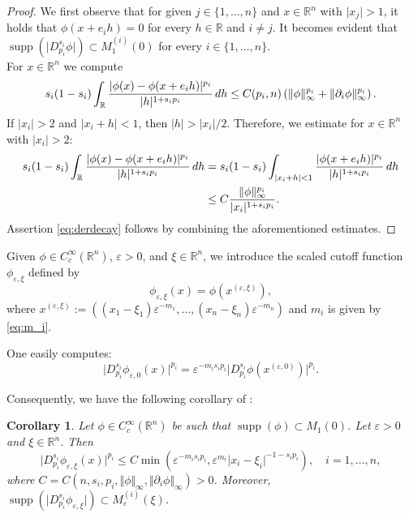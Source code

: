 \documentclass[11pt]{amsart}
\theoremstyle{plain}
\newtheorem{corollary}[theorem]{Corollary}
\theoremstyle{definition}
\numberwithin{equation}{section}
\renewcommand{\d}{\textnormal{d}}
\newcommand{\R}{\mathbb{R}}
\DeclareMathOperator{\supp}{supp}
\newcommand{\eps}{\varepsilon}
\begin{document}
\begin{proof}
We first observe that for given $j \in \{1,\dots,n\}$ and $x \in \R^n$ with $\vert x_j \vert > 1$, it holds that $\phi(x+e_ih) = 0$ for every $h \in \R$ and $i \neq j$. It becomes evident that $\supp(\vert D^{s_i}_{p_i}\phi\vert) \subset M_1^{(i)}(0)$ for every $i \in \{1,\dots,n\}$.\\
For $x \in \R^n$ we compute
\begin{equation*}
s_i(1-s_i)\int_{\mathbb{R}} \frac{|\phi(x)-\phi(x+e_ih)|^{p_i}}{|h|^{1+s_i p_i}} \,\d h \le C(p_i,n) \left(\Vert \phi \Vert_{\infty}^{p_i} + \Vert \partial_i \phi\Vert_{\infty}^{p_i}\right).
\end{equation*}
If $\vert x_i \vert > 2$ and $\vert x_i + h\vert < 1$, then $\vert h \vert > \vert x_i\vert /2$. Therefore, we estimate for $x \in \R^n$ with $\vert x_i \vert > 2$:
\begin{equation*}
\begin{split}
s_i(1-s_i)\int_{\mathbb{R}} \frac{|\phi(x)-\phi(x+e_ih)|^{p_i}}{|h|^{1+s_i p_i}} \,\d h 
&= s_i(1-s_i)\int_{\vert x_i + h \vert < 1} \frac{\vert\phi(x + e_ih)\vert^{p_i}}{\vert h \vert^{1+s_ip_i}} \, \d h \\
&\le C \frac{\Vert \phi\Vert_{\infty}^{p_i}}{\vert x_i \vert^{1+s_ip_i}}.
\end{split}
\end{equation*}
Assertion \eqref{eq:derdecay} follows by combining the aforementioned estimates.
\end{proof}

Given $\phi \in C_c^{\infty}(\R^n)$, $\eps > 0$, and $\xi \in \R^n$, we introduce the scaled cutoff function $\phi_{\eps,\xi}$ defined by 
\begin{equation}\label{def:scaledcutoff}
\phi_{\eps,\xi}(x) = \phi(x^{(\eps,\xi)}),
\end{equation}
where $x^{(\eps,\xi)} := ((x_1-\xi_1) \eps^{-m_1},\dots,(x_n-\xi_n) \eps^{-m_n})$ and $m_i$ is given by \eqref{eq:m_i}. 

One easily computes:
\begin{equation*}
\vert D^{s_i}_{p_i}\phi_{\eps,0}(x)\vert^{p_i} = \eps^{-m_is_ip_i}\vert D^{s_i}_{p_i}\phi(x^{(\eps,0)})\vert^{p_i}.
\end{equation*}

Consequently, we have the following corollary of :

\begin{corollary}
\label{cor:derdecay}
Let $\phi \in C_c^{\infty}(\R^n)$ be such that $\supp(\phi) \subset M_1(0)$. Let $\eps > 0$ and $\xi \in \R^n$. Then
\begin{equation*}
\vert D^{s_i}_{p_i}\phi_{\eps,\xi}(x)\vert^{p_i} \le C \min(\eps^{-m_is_ip_i},\eps^{m_i}\vert x_i-\xi_i \vert^{-1-s_ip_i}), \quad i = 1,\dots,n,
\end{equation*}
where $C = C(n,s_i,p_i,\Vert\phi\Vert_{\infty},\Vert \partial_i \phi\Vert_{\infty})>0$.
Moreover, $\supp(\vert D^{s_i}_{p_i}\phi_{\eps,\xi}\vert) \subset M_{\eps}^{(i)}(\xi)$.
\end{corollary}
\end{document}
